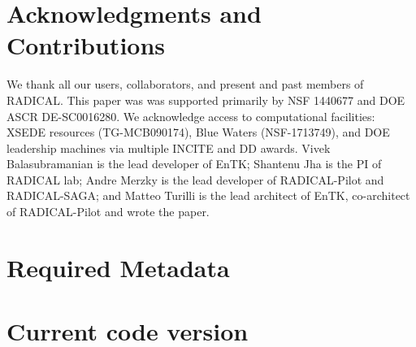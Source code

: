 \documentclass[preprint,12pt, a4paper]{elsarticle}
\begin{document}
\section*{Acknowledgments and Contributions}

We thank all our users, collaborators, and present and past members of
RADICAL\@. This paper was was supported primarily by NSF 1440677 and DOE ASCR
DE-SC0016280. We acknowledge access to computational facilities: XSEDE
resources (TG-MCB090174), Blue Waters (NSF-1713749), and DOE leadership
machines via multiple INCITE and DD awards. Vivek Balasubramanian is the lead
developer of EnTK\@; Shantenu Jha is the PI of RADICAL lab; Andre Merzky is
the lead developer of RADICAL-Pilot and RADICAL-SAGA\@; and Matteo Turilli is
the lead architect of EnTK, co-architect of RADICAL-Pilot and wrote the
paper.

 



\appendix


\section*{Required Metadata}\label{sec:metadata}


\section*{Current code version}\label{sec:src_version}

\end{document}
